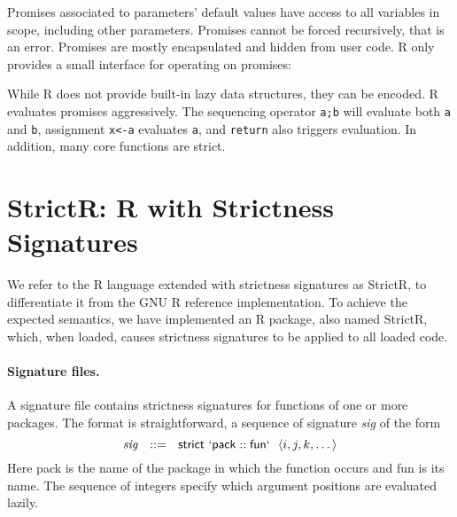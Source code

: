 \documentclass[review,nonacm,screen,acmsmall,anonymous=true]{acmart}
\newcommand{\code}[1]{\lstinline |#1|\xspace}
\newcommand{\strictr}{{\sf StrictR}\xspace}
\begin{document}
\noindent
Promises associated to parameters' default values have access to all variables
in scope, including other parameters. Promises cannot be forced recursively,
that is an error. Promises are mostly encapsulated and hidden from user code. R
only provides a small interface for operating on promises:

\noindent
While R does not provide built-in lazy data structures, they can be encoded. R
evaluates promises aggressively. The sequencing operator \code{a;b} will
evaluate both \code a and \code b, assignment \code{x<-a} evaluates \code a, and
\code{return} also triggers evaluation. In addition, many core functions are
strict.

\newpage %
\section{StrictR: R with Strictness Signatures}\label{sec:strictr}

We refer to the R language extended with strictness signatures as \strictr, to
differentiate it from the GNU R reference implementation. To achieve the
expected semantics, we have implemented an R package, also named \strictr,
which, when loaded, causes strictness signatures to be applied to all loaded
code.

\paragraph{Signature files.}
A signature file contains strictness signatures for functions of one or more
packages. The format is straightforward, a sequence of signature \emph{sig} of
the form
%
\[
\mathit{sig}~~::=~~\mathsf{strict}~\mathsf{`pack}::\mathsf{fun`}~~\langle i, j, k, \dots\rangle
\]
%
Here {\sf pack} is the name of the package in which the function occurs and {\sf
  fun} is its name. The sequence of integers specify which argument positions
are evaluated lazily.
\end{document}
